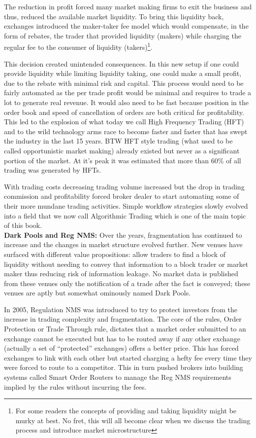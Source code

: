 The reduction in profit forced many market making firms to exit the business and thus, reduced the  available market liquidity. To bring this liquidity back, exchanges introduced the maker-taker fee model which would compensate, in the form of rebates, the trader that provided liquidity (makers) while charging the regular fee to the consumer of liquidity (takers)\footnote{For some readers the concepts of providing and taking liquidity might be murky at best. No fret, this will all become clear when we discuss the trading process and introduce market microstructure}.

This decision created unintended consequences. In this new setup if one could provide liquidity while limiting liquidity taking, one could make a small profit, due to the rebate with minimal risk and capital. This process would need to be fairly automated as the per trade profit would be minimal and requires to trade a lot to generate real revenue. It would also need to be fast because position in the order book and speed of cancellation of orders are both critical for profitability. This led to the explosion of what today we call High Frequency Trading (HFT) and to the wild technology arms race to become faster and faster that has swept the industry in the last 15 years. BTW HFT style trading (what used to be called opportunistic market making) already existed but never as a significant portion of the market. At it's peak it was estimated that more than 60\% of all trading was generated by HFTs.

With trading costs decreasing trading volume increased but the drop in trading commission and profitability forced broker dealer to start automating some of their more mundane trading activities. Simple workflow strategies slowly evolved into a field that we now call Algorithmic Trading which is one of the main topic of this book. \\

\noindent\textbf{Dark Pools and Reg NMS:} Over the years, fragmentation has continued to increase and the changes in market structure evolved further. New venues have surfaced with different value propositions: allow traders to find a block of liquidity without needing to convey that information to a block trader or market maker thus reducing risk of information leakage. No market data is published from these venues only the notification of a trade after the fact is conveyed; these venues are aptly but somewhat ominously named Dark Pools.


In 2005, Regulation NMS was introduced to try to protect investors from the increase in trading complexity and fragmentation. The core of the rules, Order Protection or Trade Through rule, dictates that a market order submitted to an exchange cannot be executed but has to be routed away if any other exchange (actually a set of ``protected'' exchanges) offers a better price. This has forced exchanges to link with each other but started charging a hefty fee every time they were forced to route to a competitor. This in turn pushed brokers into building systems called Smart Order Routers to manage the Reg NMS requirements implied by the rules without incurring the fees. \\




